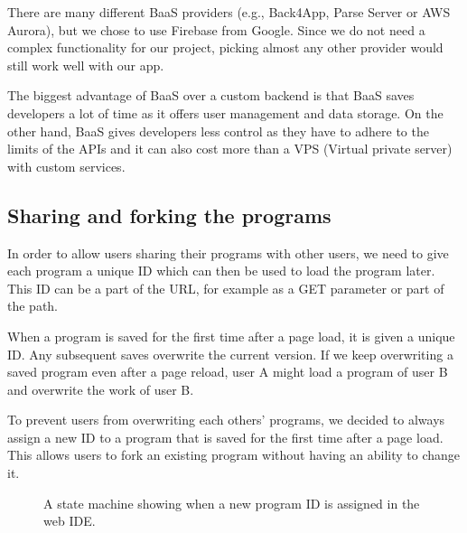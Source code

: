 There are many different BaaS providers (e.g., Back4App, Parse Server or AWS Aurora), but we chose to use Firebase \cite{Firebase} from Google. Since we do not
need a complex functionality for our project, picking almost any other provider would still work well with our app.

The biggest advantage of BaaS over a custom backend is that BaaS saves developers a lot of time as it offers user management and data storage.
On the other hand, BaaS gives developers less control as they have to adhere to the limits of the APIs and it can also cost more than a VPS (Virtual private server)
with custom services.

\subsection{Sharing and forking the programs}
\label{chap2:program_id}

In order to allow users sharing their programs with other users, we need to give each program a unique ID which can then be used to load the program later.
This ID can be a part of the URL, for example as a GET parameter or part of the path.

When a program is saved for the first time after a page load, it is given a unique ID. Any subsequent saves overwrite the current version. If we keep overwriting
a saved program even after a page reload, user A might load a program of user B and overwrite the work of user B.

To prevent users from overwriting each others' programs, we decided to always assign a new ID to a program that is saved for the first time after
a page load. This allows users to fork an existing program without having an ability to change it.

\begin{figure}[!hbt]
    \centering
	\caption{A state machine showing when a new program ID is assigned in the web IDE.}
	\label{fig:chap2:page_url}
\end{figure}

